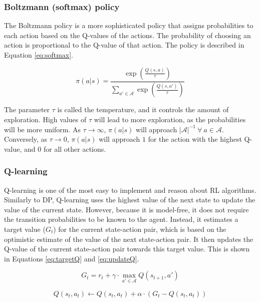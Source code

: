\documentclass{article}
\begin{document}
\subsubsection*{Boltzmann (softmax) policy}
\label{sssec:softmax}

The Boltzmann policy is a more sophisticated policy that assigns probabilities to each action based on the Q-values of the actions.
The probability of choosing an action is proportional to the Q-value of that action.
The policy is described in Equation \ref{eq:softmax}.

\begin{equation}
    \pi(a | s) = \frac{\exp \left( \frac{Q(s, a)}{\tau} \right)}{\sum_{a' \in \mathcal{A}} \exp \left( \frac{Q(s, a')}{\tau} \right)}
    \label{eq:softmax}
\end{equation}

The parameter $\tau$ is called the temperature, and it controls the amount of exploration.
High values of $\tau$ will lead to more exploration, as the probabilities will be more uniform.
As $\tau \to \infty$, $\pi(a | s)$ will approach $|\mathcal{A}|^{-1} \: \forall \: a \in \mathcal{A}$.
Conversely, as $\tau \to 0$, $\pi(a | s)$ will approach $1$ for the action with the highest Q-value, and $0$ for all other actions.

\subsubsection*{Q-learning}
\label{sssec:ql}

Q-learning is one of the most easy to implement and reason about RL algorithms.
Similarly to DP, Q-learning uses the highest value of the next state to update the value of the current state.
However, because it is model-free, it does not require the transition probabilities to be known to the agent.
Instead, it estimates a target value ($G_t$) for the current state-action pair, which is based on the optimistic estimate of the value of the next state-action pair.
It then updates the Q-value of the current state-action pair towards this target value.
This is shown in Equations \ref{eq:targetQ} and \ref{eq:updateQ}.

\begin{equation}
    G_t = r_t + \gamma \cdot \max_{a' \in \mathcal{A}} Q(s_{t+1}, a')
    \label{eq:targetQ}
\end{equation}

\begin{equation}
    Q(s_t, a_t) \leftarrow Q(s_t, a_t) + \alpha \cdot \left( G_t - Q(s_t, a_t) \right)
    \label{eq:updateQ}
\end{equation}
\end{document}
